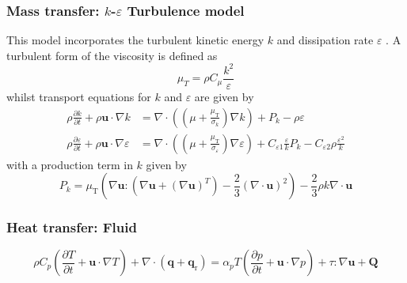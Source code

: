 \subsubsection{Mass transfer: $k$-$\varepsilon$ Turbulence model}
This model incorporates the turbulent kinetic energy $k$ and dissipation rate $\varepsilon$ \cite{comsol_cfd_2020}. A turbulent form of the viscosity is defined as
\begin{equation}
    \mu_{T}=\rho C_{\mu} \frac{k^{2}}{\varepsilon}
\end{equation}
whilst transport equations for $k$ and $\varepsilon$ are given by
\begin{align}
    \rho \frac{\partial k}{\partial t}+\rho \mathbf{u} \cdot \nabla k &= \nabla \cdot\left(\left(\mu+\frac{\mu_{\mathrm{T}}}{\sigma_{k}}\right) \nabla k\right)+P_{k}-\rho \varepsilon \\
    \rho \frac{\partial \varepsilon}{\partial t}+\rho \mathbf{u} \cdot \nabla \varepsilon &= \nabla \cdot\left(\left(\mu+\frac{\mu_{\mathrm{T}}}{\sigma_{\varepsilon}}\right) \nabla \varepsilon\right)+C_{\varepsilon 1} \frac{\varepsilon}{k} P_{k}-C_{\varepsilon 2} \rho \frac{\varepsilon^{2}}{k}
\end{align}
with a production term in $k$ given by
\begin{equation}
    P_{k}=\mu_{\mathrm{T}}\left(\nabla \mathbf{u}:\left(\nabla \mathbf{u}+(\nabla \mathbf{u})^{T}\right)-\frac{2}{3}(\nabla \cdot \mathbf{u})^{2}\right)-\frac{2}{3} \rho k \nabla \cdot \mathbf{u}
\end{equation}

\subsubsection{Heat transfer: Fluid}
\cite{comsol_heat_2020}
\begin{equation}
    \rho C_{p}\left(\frac{\partial T}{\partial t}+\mathbf{u} \cdot \nabla T\right)+\nabla \cdot\left(\mathbf{q}+\mathbf{q}_{\mathrm{r}}\right)=\alpha_{p} T\left(\frac{\partial p}{\partial t}+\mathbf{u} \cdot \nabla p\right)+\tau: \nabla \mathbf{u}+\mathbf{Q}
\end{equation}
